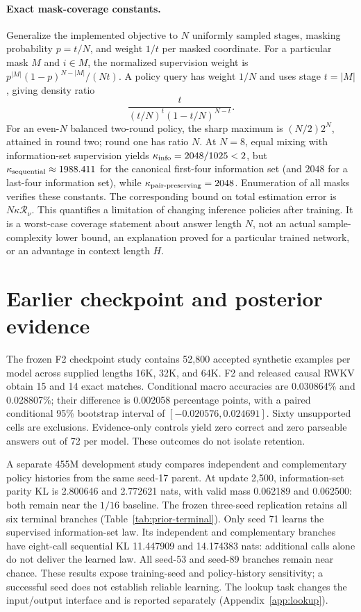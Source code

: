 \documentclass{article}
\begin{document}
\paragraph{Exact mask-coverage constants.}
Generalize the implemented objective to $N$ uniformly sampled stages,
masking probability $p=t/N$, and weight $1/t$ per masked coordinate.
For a particular mask $M$ and $i\in M$, the normalized supervision weight is
$p^{|M|}(1-p)^{N-|M|}/(Nt)$. A policy query has weight $1/N$ and uses stage
$t=|M|$, giving density ratio
\[
 \frac{t}{(t/N)^t(1-t/N)^{N-t}}.
\]
For an even-$N$ balanced two-round policy, the sharp maximum is
$(N/2)2^N$, attained in round two; round one has ratio $N$.
At $N=8$, equal mixing with information-set supervision yields
$\kappa_{\rm info}=2048/1025<2$, but
$\kappa_{\rm sequential}\approx1988.411$ for the canonical first-four
information set (and $2048$ for a last-four information set), while
$\kappa_{\rm pair\text{-}preserving}=2048$.
Enumeration of all masks verifies these constants. The corresponding bound
on total estimation error is $N\kappa\mathcal R_\nu$.
This quantifies a limitation of changing inference policies after training.
It is a worst-case coverage statement about answer length $N$, not an actual
sample-complexity lower bound, an explanation proved for a particular trained
network, or an advantage in context length $H$.



\clearpage
\section{Earlier checkpoint and posterior evidence}
\label{app:prior}
The frozen F2 checkpoint study contains 52,800 accepted synthetic examples per
model across supplied lengths 16K, 32K, and 64K. F2 and released causal RWKV
obtain 15 and 14 exact matches. Conditional macro accuracies are 0.030864\%
and 0.028807\%; their difference is 0.002058 percentage points, with a paired
conditional 95\% bootstrap interval of $[-0.020576,0.024691]$. Sixty unsupported
cells are exclusions. Evidence-only controls yield zero correct and zero
parseable answers out of 72 per model. These outcomes do not isolate retention.

A separate 455M development study compares independent and complementary
policy histories from the same seed-17 parent. At update 2,500, information-set
parity KL is 2.800646 and 2.772621 nats, with valid mass 0.062189 and 0.062500:
both remain near the $1/16$ baseline. The frozen three-seed replication retains
all six terminal branches (Table~\ref{tab:prior-terminal}). Only seed 71 learns
the supervised information-set law. Its independent and complementary branches
have eight-call sequential KL 11.447909 and 14.174383 nats: additional calls
alone do not deliver the learned law. All seed-53 and seed-89 branches remain
near chance. These results expose training-seed and policy-history sensitivity;
a successful seed does not establish reliable learning. The lookup task changes
the input/output interface and is reported separately (Appendix~\ref{app:lookup}).
\end{document}
